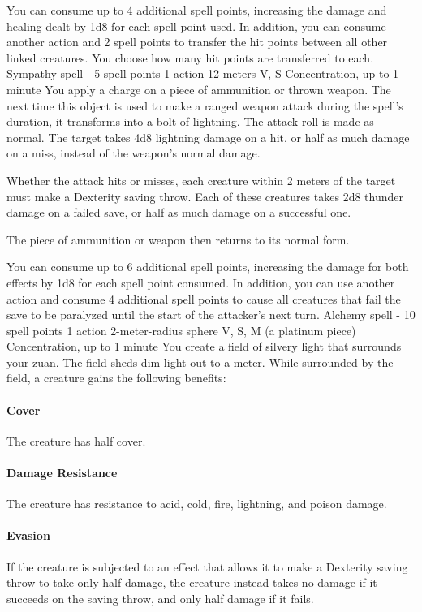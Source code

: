     You can consume up to 4 additional spell points, increasing the damage and healing dealt by 1d8 for each spell point used.
    In addition, you can consume another action and 2 spell points to transfer the hit points between all other linked creatures.
    You choose how many hit points are transferred to each.
    {Sympathy spell - 5 spell points}
    {1 action}
    {12 meters}
    {V, S}
    {Concentration, up to 1 minute}
    You apply a charge on a piece of ammunition or thrown weapon.
    The next time this object is used to make a ranged weapon attack during the spell's duration, it transforms into a bolt of lightning.
    The attack roll is made as normal.
    The target takes 4d8 lightning damage on a hit, or half as much damage on a miss, instead of the weapon's normal damage.

    Whether the attack hits or misses, each creature within 2 meters of the target must make a Dexterity saving throw.
    Each of these creatures takes 2d8 thunder damage on a failed save, or half as much damage on a successful one.

    The piece of ammunition or weapon then returns to its normal form.

    You can consume up to 6 additional spell points, increasing the damage for both effects by 1d8 for each spell point consumed.
    In addition, you can use another action and consume 4 additional spell points to cause all creatures that fail the save to be paralyzed until the start of the attacker's next turn.
    {Alchemy spell - 10 spell points}
    {1 action}
    {2-meter-radius sphere}
    {V, S, M (a platinum piece)}
    {Concentration, up to 1 minute}
    You create a field of silvery light that surrounds your zuan.
    The field sheds dim light out to a meter.
    While surrounded by the field, a creature gains the following benefits:

    \paragraph{Cover}
    The creature has half cover.
    \paragraph{Damage Resistance}
    The creature has resistance to acid, cold, fire, lightning, and poison damage.
    \paragraph{Evasion}
    If the creature is subjected to an effect that allows it to make a Dexterity saving throw to take only half damage, the creature instead takes no damage if it succeeds on the saving throw, and only half damage if it fails.

